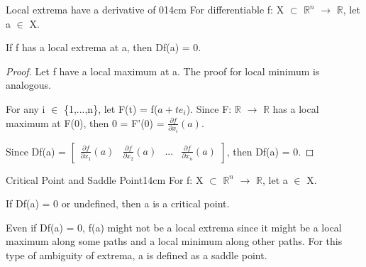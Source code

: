     \vspace{0.5cm}



    \begin{wtheorem}{Local extrema have a derivative of 0}{14cm}
        For differentiable f: X $\subset$ $\mathbb{R}^n$ $\rightarrow$ $\mathbb{R}$,
        let a $\in$ X.

        If f has a local extrema at a, then Df(a) = 0.
    \end{wtheorem}

    \begin{proof}
        Let f have a local maximum at a. The proof for local minimum is
        analogous.

        For any i $\in$ \{1,...,n\}, let F(t) = f($a+te_i$).
        Since F: $\mathbb{R}$ $\rightarrow$ $\mathbb{R}$
        has a local maximum at F(0), then
        0 = F'(0) = $\frac{\partial f}{\partial x_i}(a)$.

        Since Df(a) =
        $
        \begin{bmatrix}
            \frac{\partial f}{\partial x_1}(a)
            & \frac{\partial f}{\partial x_2}(a)
            & ...
            & \frac{\partial f}{\partial x_n}(a)
        \end{bmatrix}
        $,
        then Df(a) = 0.
    \end{proof}

    \vspace{0.5cm}



    \begin{definition}{Critical Point and Saddle Point}{14cm}
        For f: X $\subset$ $\mathbb{R}^n$ $\rightarrow$ $\mathbb{R}$,
        let a $\in$ X.

        If Df(a) = 0 or undefined, then a is a {\color{lblue} critical point}.

        \vspace{0.3cm}

        Even if Df(a) = 0, f(a) might not be a local extrema
        since it might be a local maximum along some paths and
        a local minimum along other paths.
        For this type of ambiguity of extrema, a is defined as a
        {\color{lblue} saddle point}. 
    \end{definition}

    \vspace{0.5cm}



